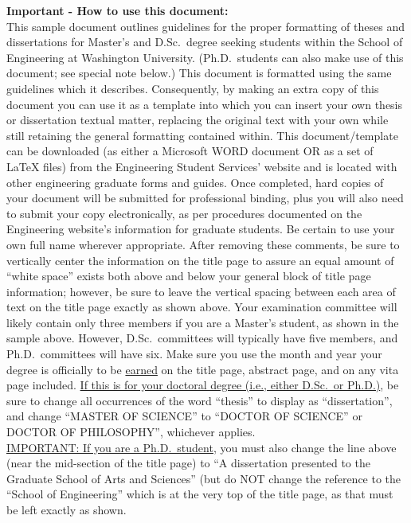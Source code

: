 \begin{extranotespage}
\iffalse
\begin{singlespace}
{ \textbf{Important - How to use this document:}} \\
This sample document outlines guidelines for the proper formatting of theses
and dissertations for Master's and D.Sc.\ degree seeking students within the
School of Engineering at Washington University.  (Ph.D.\ students can also make
use of this document; see special note below.)  This document is formatted
using the same guidelines which it describes.  Consequently, by making an extra
copy of this document you can use it as a template into which you can insert
your own thesis or dissertation textual matter, replacing the original text
with your own while still retaining the general formatting contained within.
This document/template can be downloaded (as either a Microsoft WORD document
OR as a set of \LaTeX{} files) from the Engineering Student Services' website
and is located with other engineering graduate forms and guides.  Once
completed, hard copies of your document will be submitted for professional
binding, plus you will also need to submit your copy electronically, as per
procedures documented on the Engineering website's information for graduate
students.  Be certain to use your own full name wherever appropriate.  After
removing these comments, be sure to vertically center the information on the
title page to assure an equal amount of ``white space'' exists both above and
below your general block of title page information; however, be sure to leave
the vertical spacing between each area of text on the title page exactly as
shown above.  Your examination committee will likely contain only three members
if you are a Master's student, as shown in the sample above.  However, D.Sc.\
committees will typically have five members, and Ph.D.\ committees will have
six.  Make sure you use the month and year your degree is officially to be
\uline{earned} on the title page, abstract page, and on any vita page included.
\uline{If this is for your doctoral degree (i.e., either D.Sc.\ or Ph.D.)}, be
sure to change all occurrences of the word ``thesis'' to display as
``dissertation'', and change ``MASTER OF SCIENCE'' to ``DOCTOR OF SCIENCE'' or
DOCTOR OF PHILOSOPHY'', whichever applies.   \\ \uline{IMPORTANT:  If you are a
Ph.D.\ student}, you must also change the line above (near the mid-section of
the title page) to ``A dissertation presented to the Graduate School of Arts and
Sciences'' (but do NOT change the reference to the ``School of Engineering''
which is at the very top of the title page, as that must be left exactly as shown.


\end{singlespace}
\end{extranotespage}

